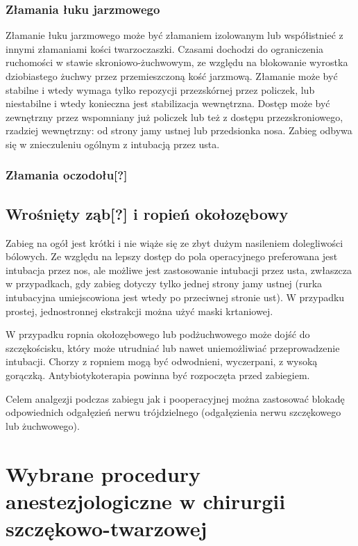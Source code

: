 \documentclass[a4paper, 12pt]{report}
\begin{document}
\subsection{Złamania łuku jarzmowego}

Złamanie łuku jarzmowego może być złamaniem izolowanym lub
współistnieć z innymi złamaniami kości twarzoczaszki. Czasami dochodzi
do ograniczenia ruchomości w stawie skroniowo-żuchwowym, ze względu na
blokowanie wyrostka dziobiastego żuchwy przez przemieszczoną kość
jarzmową. Złamanie może być stabilne i wtedy wymaga tylko repozycji
przezskórnej przez policzek, lub niestabilne i wtedy konieczna jest
stabilizacja wewnętrzna. Dostęp może być zewnętrzny przez wspomniany
już policzek lub też z dostępu przezskroniowego, rzadziej wewnętrzny:
od strony jamy ustnej lub przedsionka nosa.  Zabieg odbywa się w
znieczuleniu ogólnym z intubacją przez usta.

\subsection{Złamania oczodołu[?]}


\section{Wrośnięty ząb[?] i ropień okołozębowy}

Zabieg na ogół jest krótki i nie wiąże się ze zbyt dużym nasileniem
dolegliwości bólowych. Ze względu na lepszy dostęp do pola
operacyjnego preferowana jest intubacja przez nos, ale możliwe jest
zastosowanie intubacji przez usta, zwłaszcza w przypadkach, gdy zabieg
dotyczy tylko jednej strony jamy ustnej (rurka intubacyjna
umiejscowiona jest wtedy po przeciwnej stronie ust). W przypadku
prostej, jednostronnej ekstrakcji można użyć maski krtaniowej.

W przypadku ropnia okołozębowego lub podżuchwowego może dojść do
szczękościsku, który może utrudniać lub nawet uniemożliwiać
przeprowadzenie intubacji. Chorzy z ropniem mogą być odwodnieni,
wyczerpani, z wysoką gorączką. Antybiotykoterapia powinna być
rozpoczęta przed zabiegiem.

Celem analgezji podczas zabiegu jak i pooperacyjnej można zastosować
blokadę odpowiednich odgałęzień nerwu trójdzielnego (odgałęzienia
nerwu szczękowego lub żuchwowego).

\chapter{Wybrane procedury anestezjologiczne w chirurgii
  szczękowo-twarzowej}
\end{document}
